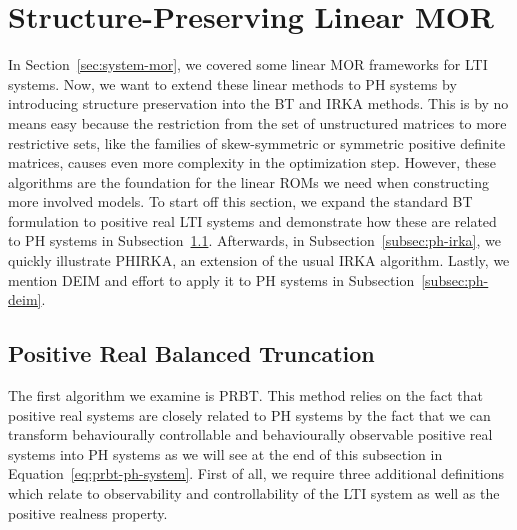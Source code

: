\section{Structure-Preserving Linear MOR}\label{sec:structure-preserving-mor}

In Section~\ref{sec:system-mor}, we covered some linear \ac{MOR} frameworks for \ac{LTI} systems.
Now, we want to extend these linear methods to \ac{PH} systems by introducing structure preservation into the \ac{BT} and \ac{IRKA} methods.
This is by no means easy because the restriction from the set of unstructured matrices to more restrictive sets, like the families of skew-symmetric or symmetric positive definite matrices, causes even more complexity in the optimization step.
However, these algorithms are the foundation for the linear \acp{ROM} we need when constructing more involved models.
To start off this section, we expand the standard \ac{BT} formulation to positive real \ac{LTI} systems and demonstrate how these are related to \ac{PH} systems in Subsection~\ref{subsec:prbt}.
Afterwards, in Subsection~\ref{subsec:ph-irka}, we quickly illustrate \ac{PHIRKA}, an extension of the usual \ac{IRKA} algorithm.
Lastly, we mention \ac{DEIM} and effort to apply it to \ac{PH} systems in Subsection~\ref{subsec:ph-deim}.

\subsection{Positive Real Balanced Truncation}\label{subsec:prbt}

The first algorithm we examine is \acf{PRBT}.
This method relies on the fact that positive real systems are closely related to \ac{PH} systems by the fact that we can transform behaviourally controllable and behaviourally observable positive real systems into \ac{PH} systems as we will see at the end of this subsection in Equation~\eqref{eq:prbt-ph-system}.
First of all, we require three additional definitions which relate to observability and controllability of the \ac{LTI} system as well as the positive realness property.

